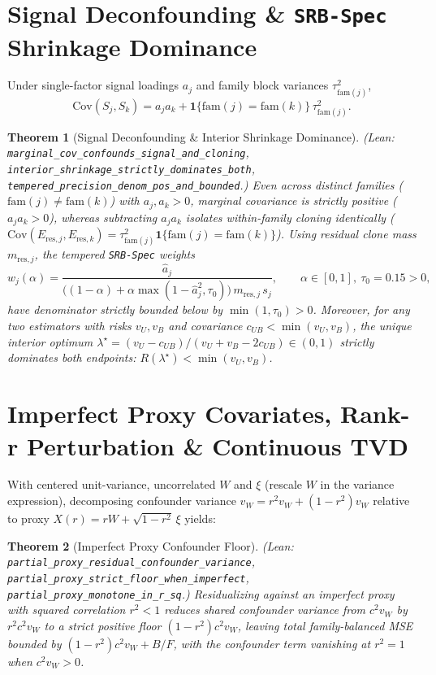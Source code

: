 \documentclass[11pt]{article}
\newtheorem{theorem}{Theorem}
\newcommand{\Cov}{\mathrm{Cov}}
\begin{document}
\section{Signal Deconfounding \& \texttt{SRB-Spec} Shrinkage Dominance}
Under single-factor signal loadings $a_j$ and family block variances $\tau_{\mathrm{fam}(j)}^2$,
\[
\Cov(S_j, S_k) = a_j a_k + \mathbf{1}\{\mathrm{fam}(j)=\mathrm{fam}(k)\}\,\tau_{\mathrm{fam}(j)}^2.
\]
\begin{theorem}[Signal Deconfounding \& Interior Shrinkage Dominance]
\emph{(Lean: \texttt{marginal\_cov\_\allowbreak confounds\_\allowbreak signal\_and\_cloning}, \texttt{interior\_\allowbreak shrinkage\_\allowbreak strictly\_\allowbreak dominates\_both}, \texttt{tempered\_\allowbreak precision\_\allowbreak denom\_\allowbreak pos\_\allowbreak and\_bounded}.)}
Even across distinct families ($\mathrm{fam}(j)\neq\mathrm{fam}(k)$) with $a_j, a_k > 0$, marginal covariance is strictly positive ($a_j a_k > 0$), whereas subtracting $a_j a_k$ isolates within-family cloning identically ($\Cov(E_{\mathrm{res},j},E_{\mathrm{res},k}) = \tau_{\mathrm{fam}(j)}^2\mathbf{1}\{\mathrm{fam}(j)=\mathrm{fam}(k)\}$). Using residual clone mass $m_{\mathrm{res},j}$, the tempered \texttt{SRB-Spec} weights
\[
w_j(\alpha) = \frac{\hat{a}_j}{\bigl((1-\alpha) + \alpha\max(1-\hat{a}_j^2, \tau_0)\bigr)\,m_{\mathrm{res},j}\,s_j}, \qquad \alpha \in [0, 1],\ \tau_0 = 0.15 > 0,
\]
have denominator strictly bounded below by $\min(1,\tau_0) > 0$. Moreover, for any two estimators with risks $v_U, v_B$ and covariance $c_{UB} < \min(v_U, v_B)$, the unique interior optimum $\lambda^\star = (v_U - c_{UB})/(v_U + v_B - 2c_{UB}) \in (0,1)$ strictly dominates both endpoints: $R(\lambda^\star) < \min(v_U, v_B)$.
\end{theorem}

\section{Imperfect Proxy Covariates, Rank-r Perturbation \& Continuous TVD}
With centered unit-variance, uncorrelated $W$ and $\xi$ (rescale $W$ in the variance expression), decomposing confounder variance $v_W = r^2 v_W + (1 - r^2) v_W$ relative to proxy $X(r) = rW + \sqrt{1-r^2}\,\xi$ yields:
\begin{theorem}[Imperfect Proxy Confounder Floor]
\emph{(Lean: \texttt{partial\_proxy\_\allowbreak residual\_\allowbreak confounder\_variance}, \texttt{partial\_proxy\_\allowbreak strict\_\allowbreak floor\_\allowbreak when\_imperfect}, \texttt{partial\_proxy\_\allowbreak monotone\_\allowbreak in\_r\_sq}.)}
Residualizing against an imperfect proxy with squared correlation $r^2 < 1$ reduces shared confounder variance from $c^2 v_W$ by $r^2 c^2 v_W$ to a strict positive floor $(1-r^2)c^2 v_W$, leaving total family-balanced MSE bounded by $(1-r^2)c^2 v_W + B/F$, with the confounder term vanishing at $r^2 = 1$ when $c^2 v_W>0$.
\end{theorem}
\end{document}
